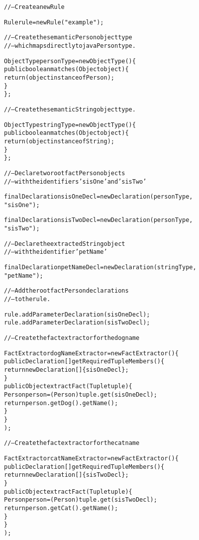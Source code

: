 \footnotesize
\begin{alltt}
// -- Create a new Rule

Rule rule = new Rule("example");

// -- Create the semantic Person object type
// -- which maps directly to java Person type.

ObjectType personType = new ObjectType() \{
        public boolean matches(Object object) \{ 
            return ( object instanceof Person );
        \}
    \};

// -- Create the semantic String object type.

ObjectType stringType = new ObjectType() \{
        public boolean matches(Object object) \{ 
            return ( object instanceof String );
        \}
    \};

// -- Declare two root fact Person objects 
// -- with the identifiers 'sisOne' and 'sisTwo'

final Declaration sisOneDecl = new Declaration( personType,
                                                "sisOne" );

final Declaration sisTwoDecl = new Declaration( personType,
                                                "sisTwo" );

// -- Declare the extracted String object
// -- with the identifier 'petName'

final Declaration petNameDecl = new Declaration( stringType,
                                                 "petName" );

// -- Add the root fact Person declarations
// -- to the rule.

rule.addParameterDeclaration( sisOneDecl );
rule.addParameterDeclaration( sisTwoDecl );

\newpage

// -- Create the fact extractor for the dog name

FactExtractor dogNameExtractor = new FactExtractor() \{
        public Declaration[] getRequiredTupleMembers() \{
            return new Declaration[] \{ sisOneDecl \};
        \}
        public Object extractFact(Tuple tuple) \{
            Person person = (Person) tuple.get( sisOneDecl );
            return person.getDog().getName();
        \}
    \}
      );

// -- Create the fact extractor for the cat name

FactExtractor catNameExtractor = new FactExtractor() \{
        public Declaration[] getRequiredTupleMembers() \{
            return new Declaration[] \{ sisTwoDecl \};
        \}
        public Object extractFact(Tuple tuple) \{
            Person person = (Person) tuple.get( sisTwoDecl );
            return person.getCat().getName();
        \}
    \}
      );


\end{alltt}
